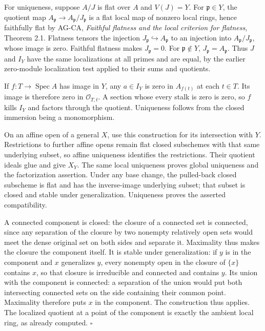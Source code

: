 \documentclass[11pt,a4paper,openany]{report}
\newcounter{none}
\begin{document}
For uniqueness, suppose \(A/J\) is flat over \(A\) and \(V(J)=Y\). For \(\mathfrak p\in Y\), the quotient map \(A_{\mathfrak p}\to A_{\mathfrak p}/J_{\mathfrak p}\) is a flat local map of nonzero local rings, hence faithfully flat by AG-CA, \emph{Faithful flatness and the local criterion for flatness}, Theorem 2.1. Flatness tensors the injection \(J_{\mathfrak p}\hookrightarrow A_{\mathfrak p}\) to an injection into \(A_{\mathfrak p}/J_{\mathfrak p}\), whose image is zero. Faithful flatness makes \(J_{\mathfrak p}=0\). For \(\mathfrak p\notin Y\), \(J_{\mathfrak p}=A_{\mathfrak p}\). Thus \(J\) and \(I_Y\) have the same localizations at all primes and are equal, by the earlier zero-module localization test applied to their sums and quotients.

If \(f:T\to\operatorname{Spec}A\) has image in \(Y\), any \(a\in I_Y\) is zero in \(A_{f(t)}\) at each \(t\in T\). Its image is therefore zero in \(\mathcal O_{T,t}\). A section whose every stalk is zero is zero, so \(f\) kills \(I_Y\) and factors through the quotient. Uniqueness follows from the closed immersion being a monomorphism.

On an affine open of a general \(X\), use this construction for its intersection with \(Y\). Restrictions to further affine opens remain flat closed subschemes with that same underlying subset, so affine uniqueness identifies the restrictions. Their quotient ideals glue and give \(X_Y\). The same local uniqueness proves global uniqueness and the factorization assertion. Under any base change, the pulled-back closed subscheme is flat and has the inverse-image underlying subset; that subset is closed and stable under generalization. Uniqueness proves the asserted compatibility.

A connected component is closed: the closure of a connected set is connected, since any separation of the closure by two nonempty relatively open sets would meet the dense original set on both sides and separate it. Maximality thus makes the closure the component itself. It is stable under generalization: if \(y\) is in the component and \(x\) generalizes \(y\), every nonempty open in the closure of \(\{x\}\) contains \(x\), so that closure is irreducible and connected and contains \(y\). Its union with the component is connected: a separation of the union would put both intersecting connected sets on the side containing their common point. Maximality therefore puts \(x\) in the component. The construction thus applies. The localized quotient at a point of the component is exactly the ambient local ring, as already computed. \(\square\)
\end{document}
